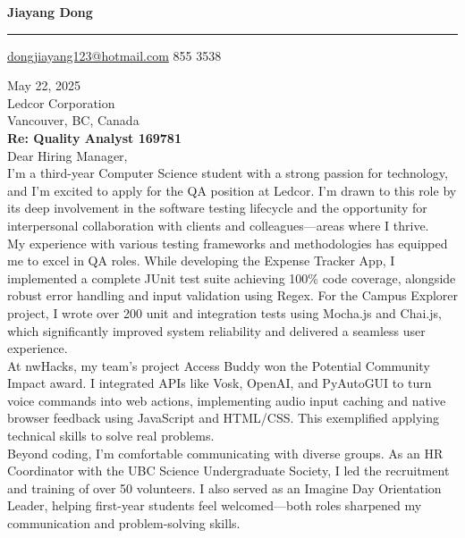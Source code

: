 \documentclass[letterpaper,12pt]{article}
\begin{document}
    \color{almost_black}
    
    {\fontsize{24pt}{28pt}\selectfont \textbf{Jiayang Dong} \par}
    \vspace{-1.5mm}
    \noindent\rule{\linewidth}{1.5pt}
    \vspace{3mm}
    \href{mailto:dongjiayang123@hotmail.com}{dongjiayang123@hotmail.com}  855 3538

    \vspace{3.5mm}
    May 22, 2025 \\
 
    Ledcor Corporation \\
    Vancouver, BC, Canada \\
     
    \textbf{Re: Quality Analyst 169781} \\
    
    Dear Hiring Manager, \\
     
    I’m a third-year Computer Science student with a strong passion for technology, and I’m excited to apply for the QA position at Ledcor. I’m drawn to this role by its deep involvement in the software testing lifecycle and the opportunity for interpersonal collaboration with clients and colleagues—areas where I thrive. \\
    
    My experience with various testing frameworks and methodologies has equipped me to excel in QA roles. While developing the Expense Tracker App, I implemented a complete JUnit test suite achieving 100\% code coverage, alongside robust error handling and input validation using Regex. For the Campus Explorer project, I wrote over 200 unit and integration tests using Mocha.js and Chai.js, which significantly improved system reliability and delivered a seamless user experience. \\
    
    At nwHacks, my team’s project Access Buddy won the Potential Community Impact award. I integrated APIs like Vosk, OpenAI, and PyAutoGUI to turn voice commands into web actions, implementing audio input caching and native browser feedback using JavaScript and HTML/CSS. This exemplified applying technical skills to solve real problems. \\
    
    Beyond coding, I’m comfortable communicating with diverse groups. As an HR Coordinator with the UBC Science Undergraduate Society, I led the recruitment and training of over 50 volunteers. I also served as an Imagine Day Orientation Leader, helping first-year students feel welcomed—both roles sharpened my communication and problem-solving skills. \\
    
\end{document}
